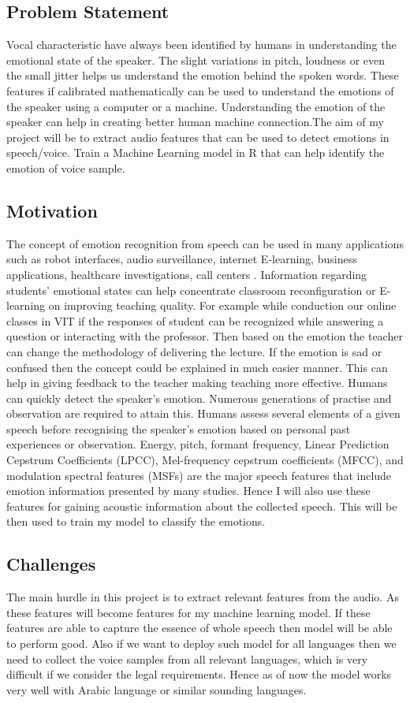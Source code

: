 \documentclass[11pt,a4paper]{article}
\begin{document}
	\subsection{Problem Statement}
	Vocal characteristic have always been identified by humans in understanding the emotional state of the speaker. The slight variations in pitch, loudness or even the small jitter helps us understand the emotion behind the spoken words. These features if calibrated mathematically can be used to understand the emotions of the speaker using a computer or a machine. Understanding the emotion of the speaker can help in creating better human machine connection.The aim of my project will be to extract audio features that can be used to detect emotions in speech/voice. Train a Machine Learning model in R that can help identify the emotion of voice sample.
	\subsection{Motivation}
	The concept of emotion recognition from speech can be used in many applications such as robot interfaces, audio surveillance, internet E-learning, business applications, healthcare investigations, call centers \cite{han2020ordinal}. Information regarding students' emotional states can help concentrate classroom reconfiguration or E-learning on improving teaching quality. For example while conduction our online classes in VIT if the responses of student can be recognized while answering a question or interacting with the professor. Then based on the emotion the teacher can change the methodology of delivering the lecture. If the emotion is sad or confused then the concept could be explained in much easier manner. This can help in giving feedback to the teacher making teaching more effective. Humans can quickly detect the speaker's emotion. Numerous generations of practise and observation are required to attain this. Humans assess several elements of a given speech before recognising the speaker's emotion based on personal past experiences or observation.  Energy, pitch, formant frequency, Linear Prediction Cepstrum Coefficients (LPCC), Mel-frequency cepstrum coefficients (MFCC), and modulation spectral features (MSFs) are the major speech features that include emotion information presented by many studies. Hence I will also use these features for gaining acoustic information about the collected speech. This will be then used to train my model to classify the emotions.
	\subsection{Challenges}
	The main hurdle in this project is to extract relevant features from the audio. As these features will become features for my machine learning model. If these features are able to capture the essence of whole speech then model will be able to perform good. Also if we want to deploy such model for all languages then we need to collect the voice samples from all relevant languages, which is very difficult if we consider the legal requirements. Hence as of now the model works very well with Arabic language or similar sounding languages.
\end{document}
